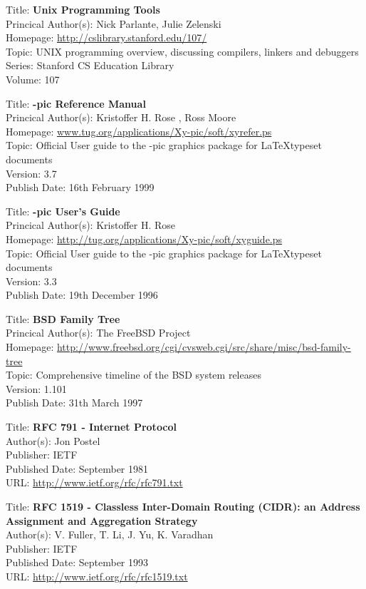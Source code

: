 
Title: 	\textbf{Unix Programming Tools}	\\
Princical Author(s): 	Nick Parlante, Julie Zelenski \\
Homepage: 	\url{http://cslibrary.stanford.edu/107/}	\\	
Topic:		UNIX programming overview, discussing compilers, linkers and debuggers \\
Series:		Stanford CS Education Library	\\
Volume:		107 


Title: 	\textbf{\Xy-pic Reference Manual}	\\
Princical Author(s): 	Kristoffer H. Rose , Ross Moore \\
Homepage:	\url{www.tug.org/applications/Xy-pic/soft/xyrefer.ps} 	\\	
Topic:		Official User guide to the \Xy-pic graphics package for \LaTeX typeset documents \\
Version:		3.7 \\
Publish Date:		16th February 1999


Title: 	\textbf{\Xy-pic User's Guide}	\\
Princical Author(s): 	Kristoffer H. Rose  \\
Homepage:	\url{http://tug.org/applications/Xy-pic/soft/xyguide.ps} 	\\	
Topic:		Official User guide to the \Xy-pic graphics package for \LaTeX typeset documents \\
Version:		3.3 \\
Publish Date:		19th December 1996


Title: 	\textbf{BSD Family Tree}	\\
Princical Author(s): 	The FreeBSD Project \\
Homepage:
\url{http://www.freebsd.org/cgi/cvsweb.cgi/src/share/misc/bsd-family-tree} 	\\	
Topic:		Comprehensive timeline of the BSD system releases\\
Version:		1.101 \\
Publish Date:		31th March 1997


Title: \textbf{RFC 791 - Internet Protocol} \\
Author(s): Jon Postel \\
Publisher: IETF \\ 
Published Date: September 1981 \\ 
URL: \url{http://www.ietf.org/rfc/rfc791.txt}    


Title: \textbf{RFC 1519 - Classless Inter-Domain Routing (CIDR): an Address} \\
\hspace{15mm} \textbf{Assignment and Aggregation Strategy} \\
Author(s): V. Fuller, T. Li, J. Yu, K. Varadhan \\
Publisher: IETF \\ 
Published Date: September 1993  \\
URL: \url{http://www.ietf.org/rfc/rfc1519.txt}   


